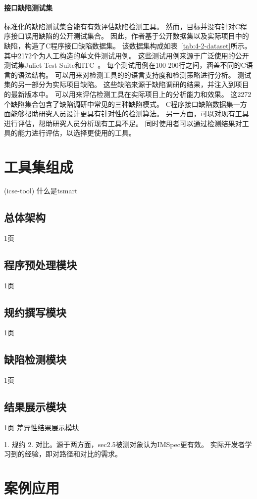 \paragraph{接口缺陷测试集}
标准化的缺陷测试集合能有有效评估缺陷检测工具。
然而，目标并没有针对C程序接口误用缺陷的公开测试集合。
因此，作者基于公开数据集以及实际项目中的缺陷，构造了C程序接口缺陷数据集。
该数据集构成如表~\ref{tab:4-2-dataset}所示。
其中2172个为人工构造的单文件测试用例。
这些测试用例来源于广泛使用的公开测试集Juliet Test Suite和ITC~\cite{itc}。
每个测试用例在100-200行之间，涵盖不同的C语言的语法结构。
可以用来对检测工具的的语言支持度和检测策略进行分析。
测试集的另一部分为实际项目缺陷。
这些缺陷来源于缺陷调研的结果，并注入到项目的最新版本中。
可以用来评估检测工具在实际项目上的分析能力和效果。
这2272个缺陷集合包含了缺陷调研中常见的三种缺陷模式。
C程序接口缺陷数据集一方面能够帮助研究人员设计更具有针对性的检测算法。
另一方面，可以对现有工具进行评估，帮助研究人员分析现有工具不足。
同时使用者可以通过检测结果对工具的能力进行评估，以选择更使用的工具。


\section{工具集组成}
\label{sec:4.3}


(icse-tool)
什么是tsmart
\subsection{总体架构}
1页
\subsection{程序预处理模块}
1页
\subsection{规约撰写模块}
1页
\subsection{缺陷检测模块}
1页
\subsection{结果展示模块}
1页
差异性结果展示模块

1. 规约 2. 对比。源于两方面，sec2.5被测对象认为IMSpec更有效。
实际开发者学习到的经验，即对路径和对比的需求。

\section{案例应用}
\label{sec:4.4}

